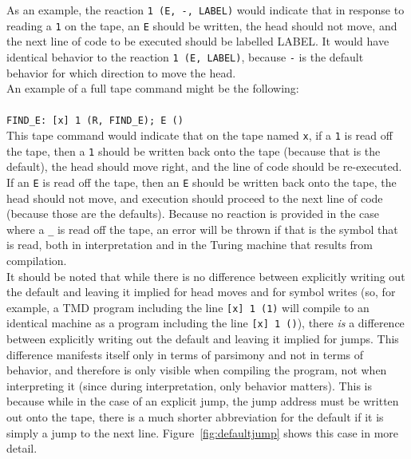 \documentclass[11pt]{article}
\begin{document}
As an example, the reaction \texttt{1 (E, -, LABEL)} would indicate that in response to reading a \texttt{1} on the tape, an \texttt{E} should be written, the head should not move, and the next line of code to be executed should be labelled LABEL. It would have identical behavior to the reaction \texttt{1 (E, LABEL)}, because \texttt{-} is the default behavior for which direction to move the head. \\

An example of a full tape command might be the following: \\ \\
\texttt{FIND\_E: [x] 1 (R, FIND\_E); E ()} \\

This tape command would indicate that on the tape named \texttt{x}, if a \texttt{1} is read off the tape, then a \texttt{1} should be written back onto the tape (because that is the default), the head should move right, and the line of code should be re-executed. If an \texttt{E} is read off the tape, then an \texttt{E} should be written back onto the tape, the head should not move, and execution should proceed to the next line of code (because those are the defaults). Because no reaction is provided in the case where a \texttt{\_} is read off the tape, an error will be thrown if that is the symbol that is read, both in interpretation and in the Turing machine that results from compilation. \\

It should be noted that while there is no difference between explicitly writing out the default and leaving it implied for head moves and for symbol writes (so, for example, a TMD program including the line \texttt{[x] 1 (1)} will compile to an identical machine as a program including the line \texttt{[x] 1 ()}), there \emph{is} a difference between explicitly writing out the default and leaving it implied for jumps. This difference manifests itself only in terms of parsimony and not in terms of behavior, and therefore is only visible when compiling the program, not when interpreting it (since during interpretation, only behavior matters). This is because while in the case of an explicit jump, the jump address must be written out onto the tape, there is a much shorter abbreviation for the default if it is simply a jump to the next line. Figure~\ref{fig:defaultjump} shows this case in more detail.
\end{document}
